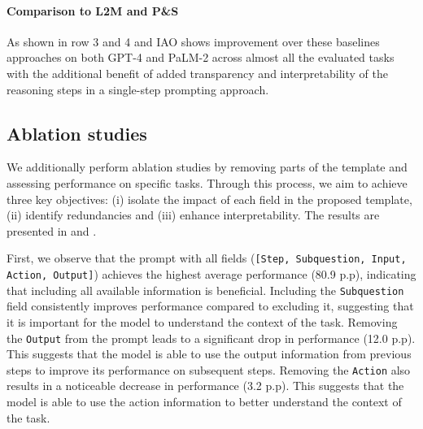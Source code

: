 \paragraph{Comparison to L2M and P\&S} As shown in row 3 and 4  and  IAO shows improvement over these baselines approaches on both GPT-4 and PaLM-2 across almost all the evaluated tasks with the additional benefit of added transparency and interpretability of the reasoning steps in a single-step prompting approach.


\subsection{Ablation studies}

We additionally perform ablation studies by removing parts of the template and assessing performance on specific tasks. Through this process, we aim to achieve three key objectives: (i) isolate the impact of each field in the proposed template, (ii) identify redundancies and (iii) enhance interpretability. The results are presented in  and .

\begin{table}[h]
\caption{Performance in a zero-shot setting when one of the field of the prompt is removed.}
\label{tab:ablation_results}
\end{table}

First, we observe that the prompt with all fields (\texttt{[Step, Subquestion, Input, Action, Output]}) achieves the highest average performance (80.9 p.p), indicating that including all available information is beneficial. Including the \texttt{Subquestion} field consistently improves performance compared to excluding it, suggesting that it is important for the model to understand the context of the task. Removing the \texttt{Output} from the prompt leads to a significant drop in performance (12.0 p.p). This suggests that the model is able to use the output information from previous steps to improve its performance on subsequent steps. Removing the \texttt{Action} also results in a noticeable decrease in performance (3.2 p.p). This suggests that the model is able to use the action information to better understand the context of the task.

